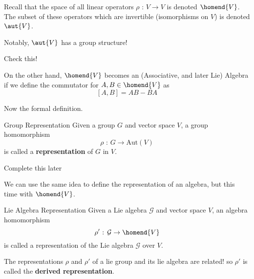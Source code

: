 \documentclass[11pt]{article}
\begin{document}
\vskip 0.5cm
\begin{redbox}
  Recall that the space of all linear operators $\rho \text{ : } V \rightarrow V$ is denoted $\homend{V}$. The subset of these operators which are invertible (isomorphisms on $V$) is denoted $\aut{V}$. 
  
  \vskip 0.5cm
  Notably, $\aut{V}$ has a group structure! \begin{thought}{Check this!} \end{thought} On the other hand, $\homend{V}$ becomes an (Associative, and later Lie) Algebra if we define the commutator for $A, B \in \homend{V}$ as
  \[ [A, B] = AB - BA \] 
  
\end{redbox}

\vskip 0.5cm
Now the formal definition.

\vskip 0.5cm
\begin{defn}{Group Representation}
  Given a group $G$ and vector space $V$, a group homomorphism \[ \rho \text{ : } G \rightarrow \mathrm{Aut}(V) \] is called a \textbf{representation} of $G$ in $V$.
\end{defn}

\begin{example}
  Complete this later
\end{example}

\vskip 0.5cm

We can use the same idea to define the representation of an algebra, but this time with $\homend{V}$.

\begin{defn}{Lie Algebra Representation}
  Given a Lie algebra $\mathcal{G}$ and vector space $V$, an algebra homomorphism \[ \rho' \text{ : } \mathcal{G} \rightarrow \homend{V} \] is called a representation of the Lie algebra $\mathcal{G}$ over $V$.
\end{defn}

\begin{remark}{The representations $\rho$ and $\rho'$ of a lie group and its lie algebra are related! so $\rho'$ is called the \textbf{derived representation}.}
\end{remark}
\end{document}
